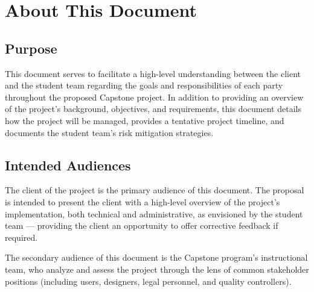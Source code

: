 \documentclass[10pt,letterpaper]{article}
\begin{document}
\begin{titlepage}
	\maketitle
\end{titlepage}

% 







\thispagestyle{empty}
\listoffigures
\listoftables
\newpage

\setcounter{page}{1}

\section{About This Document}\label{section:about}

\subsection{Purpose}

This document serves to facilitate a high-level understanding between the client and the student team 
regarding the goals and responsibilities of each party throughout the proposed Capstone project.
In addition to providing an overview of the project's background, objectives, and requirements, this 
document details how the project will be managed, provides a tentative project timeline, and documents the student team's risk mitigation strategies.

\subsection{Intended Audiences}

The client of the project is the primary audience of this document. The proposal is intended to present the client with a high-level overview of the project's implementation, both technical and administrative, as envisioned by the student team --- providing the client an opportunity to offer corrective feedback if required.

The secondary audience of this document is the Capstone program's instructional team, who analyze and assess the project through the lens of common stakeholder positions (including users, designers, legal personnel, and quality controllers). 
\end{document}
